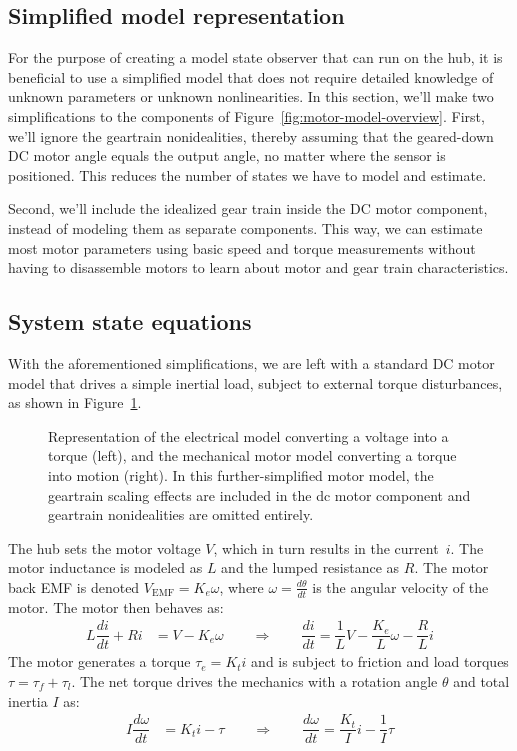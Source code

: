 \documentclass[12pt, a4paper]
{article}
\providecommand{\w}{\omega}
\renewcommand{\th}{\theta}
\providecommand{\w}{\omega}
\begin{document}
\subsection{Simplified model representation}

For the purpose of creating a model state observer that can run on the hub, it
is beneficial to use a simplified model that does not require detailed
knowledge of unknown parameters or unknown nonlinearities. In this section,
we'll make two simplifications to the components of
Figure~\ref{fig:motor-model-overview}. First, we'll ignore the geartrain
nonidealities, thereby assuming that the geared-down DC motor angle equals the
output angle, no matter where the sensor is positioned. This reduces the
number of states we have to model and estimate.

Second, we'll include the idealized gear train inside the DC motor component,
instead of modeling them as separate components. This way, we can estimate most
motor parameters using basic speed and torque measurements without having to
disassemble motors to learn about motor and gear train characteristics.


\subsection{System state equations}

With the aforementioned simplifications, we are left with a standard DC motor
model that drives a simple inertial load, subject to external torque
disturbances, as shown in Figure~\ref{fig:motor-model-symbols}.

\begin{figure}[H]
    \centering
    
    \caption{Representation of the electrical model converting a voltage into
    a torque (left), and the mechanical motor model converting a torque into
    motion (right). In this further-simplified motor model, the geartrain
    scaling effects are included in the dc motor component and geartrain
    nonidealities are omitted entirely. \label{fig:motor-model-symbols}}
\end{figure}

The hub sets the motor voltage $V$, which in turn results in the current~$i$.
The motor inductance is modeled as $L$ and the lumped resistance as $R$. The
motor back EMF is denoted $V_\text{EMF}=K_e\w$, where $\w =
\frac{d\theta}{dt}$ is the angular velocity of the motor. The motor then
behaves as:
%
\begin{align}
    \label{eq:state1}
    L\dfrac{di}{dt} + R i &= V - K_e\w \qquad \Rightarrow \qquad
    \dfrac{di}{dt} = \dfrac{1}{L}V - \dfrac{K_e}{L}\w - \dfrac{R}{L} i
\end{align}
%
The motor generates a torque $\tau_e = K_t i$ and is subject to friction and
load torques $\tau = \tau_f + \tau_l$. The net torque drives the mechanics with
a rotation angle $\th$ and total inertia $I$ as:
\begin{align}
    \label{eq:state2}
    I \dfrac{d\w}{dt} &= K_t i - \tau \qquad \Rightarrow \qquad
    \dfrac{d\w}{dt} = \dfrac{K_t}{I}i - \dfrac{1}{I}\tau
\end{align}
\end{document}
